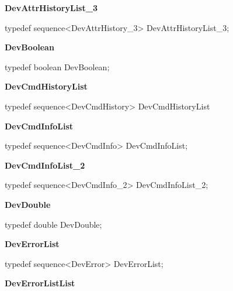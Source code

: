 \begin{flushleft}
\textbf{DevAttrHistoryList\_3}
\par\end{flushleft}

typedef sequence<DevAttrHistory\_3> DevAttrHistoryList\_3;\\

\begin{flushleft}
\textbf{DevBoolean}
\par\end{flushleft}

typedef boolean DevBoolean;\\

\begin{flushleft}
\textbf{DevCmdHistoryList}
\par\end{flushleft}

typedef sequence<DevCmdHistory> DevCmdHistoryList\\

\begin{flushleft}
\textbf{DevCmdInfoList}
\par\end{flushleft}

typedef sequence<DevCmdInfo> DevCmdInfoList;\\

\begin{flushleft}
\textbf{DevCmdInfoList\_2}
\par\end{flushleft}

typedef sequence<DevCmdInfo\_2> DevCmdInfoList\_2;\\

\begin{flushleft}
\textbf{DevDouble}
\par\end{flushleft}

typedef double DevDouble;\\

\begin{flushleft}
\textbf{DevErrorList}
\par\end{flushleft}

typedef sequence<DevError> DevErrorList;\\

\begin{flushleft}
\textbf{DevErrorListList}
\par\end{flushleft}

